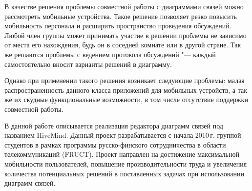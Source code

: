 В качестве решения проблемы совместной работы с диаграммами связей можно рассмотреть мобильные устройства. Такое решение позволяет резко повысить мобильность персонала и расширить пространство проведения обсуждений. Любой член группы может принимать участие в решении проблемы не зависимо от места его нахождения, будь он в соседней комнате или в другой стране. Так же решаются проблемы с ведением протокола обсуждений "--- каждый самостоятельно вносит варианты решений в диаграмму.

Однако при применении такого решения возникает следующие проблемы: малая распространенность данного класса приложений для мобильных устройств, а так же их скудные функциональные возможности, в том числе отсутствие поддержки совместной работы.

В данной работе описывается реализация редактора диаграмм связей под названием HiveMind. Данный проект разрабатывается с начала 2010\,г. группой студентов в рамках программы русско-финского сотрудничества в области телекоммуникаций (FRUCT). Проект направлен на достижение максимальной мобильности пользователей, повышение производительности труда и увеличения количества потенциальных решений в поставленных задачах при использовании диаграмм связей.